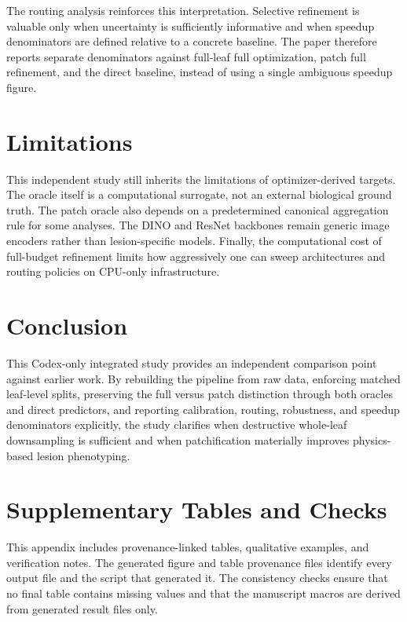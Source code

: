 \documentclass[11pt]{article}
\begin{document}
The routing analysis reinforces this interpretation. Selective refinement is valuable only when uncertainty is sufficiently informative and when speedup denominators are defined relative to a concrete baseline. The paper therefore reports separate denominators against full-leaf full optimization, patch full refinement, and the direct baseline, instead of using a single ambiguous speedup figure.

\section{Limitations}
This independent study still inherits the limitations of optimizer-derived targets. The oracle itself is a computational surrogate, not an external biological ground truth. The patch oracle also depends on a predetermined canonical aggregation rule for some analyses. The DINO and ResNet backbones remain generic image encoders rather than lesion-specific models. Finally, the computational cost of full-budget refinement limits how aggressively one can sweep architectures and routing policies on CPU-only infrastructure.

\section{Conclusion}
This Codex-only integrated study provides an independent comparison point against earlier work. By rebuilding the pipeline from raw data, enforcing matched leaf-level splits, preserving the full versus patch distinction through both oracles and direct predictors, and reporting calibration, routing, robustness, and speedup denominators explicitly, the study clarifies when destructive whole-leaf downsampling is sufficient and when patchification materially improves physics-based lesion phenotyping.

\appendix
\section{Supplementary Tables and Checks}
This appendix includes provenance-linked tables, qualitative examples, and verification notes. The generated figure and table provenance files identify every output file and the script that generated it. The consistency checks ensure that no final table contains missing values and that the manuscript macros are derived from generated result files only.









\end{document}
